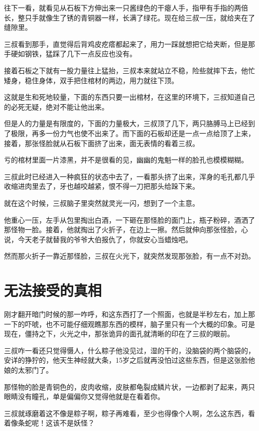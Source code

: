 往下一看，就看见从石板下方伸出来一只酱绿色的干瘪人手，指甲有手指的两倍长，整只手就像生了锈的青铜器一样，长满了绿花。现在给三叔一压，就给夹在了缝隙里。

三叔看到那手，直觉得后背鸡皮疙瘩都起来了，用力一踩就想把它给夹断，但是那手硬如钢铁，猛踩了几下一点反应也没有。

接着石板之下就有一股力量往上猛抬，三叔本来就站立不稳，险些就摔下去，他忙矮身，稳住身体，双手把住棺材的两边，用力就往下顶。

这就是生和死地较量，下面的东西只要一出棺材，在这里的环境下，三叔知道自己的必死无疑，绝对不能让他出来。

但是人的力量是有限度的，下面的力量极大，三叔顶了几下，两只胳膊马上已经到了极限，再多一份力气也使不出来了。而下面的石板却还是一点一点给顶了上来，接着，那张怪脸就从石板下面挤了出来，面无表情的看着三叔。

亏的棺材里面一片漆黑，并不是很看的见，幽幽的鬼魁一样的脸孔也模模糊糊。

三叔此时已经进入一种疯狂的状态中去了，一看那头挤了出来，浑身的毛孔都几乎收缩进肉里去了，牙也越咬越紧，恨不得一刀把那头给跺下来。

就在这个时候，三叔脑子里突然就灵光一闪，想到了一个主意。

他重心一压，左手从包里掏出白酒，一下砸在那怪脸的面门上，瓶子粉碎，酒洒了那怪物一脸。接着，他就掏出了火折子，在边上一擦。然后就伸向那张怪脸，心说，今天老子就替我的爷爷大伯报仇了，你就安心当蜡烛吧。

然而那火折子一靠近那怪脸，三叔在火光下，就突然发现那张脸，有一点不对劲。

\chapter{无法接受的真相}

刚才翻开暗门时候的那一咋呼，和这东西打了一个照面，也就是半秒左右，加上那一下的吓唬，也不可能仔细观瞧那东西的模样，脑子里只有一个大概的印象。可是现在，僵持之下，火光之中，那张诡异的面孔就清晰的印在了三叔的眼前。

三叔咋一看还只觉得慑人，什么粽子他没见过，湿的干的，没脑袋的两个脑袋的，安详的狰狞的，他天生神经就大条，15岁之后就再没怕过这些东西，但是这张脸他娘的太邪门了。

那怪物的脸是青铜色的，皮肉收缩，皮肤都龟裂成鳞片状，一边都剥了起来，两只眼睛没有瞳孔，单是偏偏你又觉得他就是在看着你。

三叔就琢磨着这不像是粽子啊，粽子再难看，至少也得像个人啊，怎么这东西，看着像条蛇呢！这该不是妖怪？

